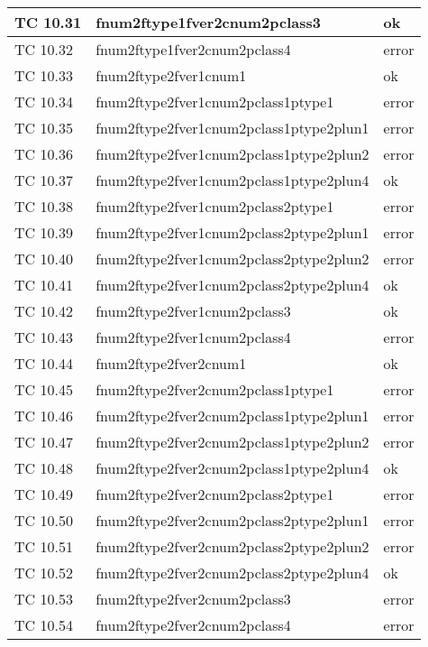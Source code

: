 \begin{longtable}{|p{3cm}|p{7cm}|p{3cm}|}
	\hline
	TC 10.31			& fnum2ftype1fver2cnum2pclass3			& ok \tabularnewline
	\hline
	TC 10.32			& fnum2ftype1fver2cnum2pclass4			& error \tabularnewline
	\hline
	TC 10.33			& fnum2ftype2fver1cnum1				& ok \tabularnewline
	\hline
	TC 10.34			& fnum2ftype2fver1cnum2pclass1ptype1		& error \tabularnewline
	\hline
	TC 10.35			& fnum2ftype2fver1cnum2pclass1ptype2plun1	& error \tabularnewline
	\hline
	TC 10.36			& fnum2ftype2fver1cnum2pclass1ptype2plun2	& error \tabularnewline
	\hline
	TC 10.37			& fnum2ftype2fver1cnum2pclass1ptype2plun4	& ok \tabularnewline
	\hline
	TC 10.38			& fnum2ftype2fver1cnum2pclass2ptype1		& error \tabularnewline
	\hline
	TC 10.39			& fnum2ftype2fver1cnum2pclass2ptype2plun1	& error \tabularnewline
	\hline
	TC 10.40			& fnum2ftype2fver1cnum2pclass2ptype2plun2	& error \tabularnewline
	\hline
	TC 10.41			& fnum2ftype2fver1cnum2pclass2ptype2plun4	& ok \tabularnewline
	\hline
	TC 10.42			& fnum2ftype2fver1cnum2pclass3			& ok \tabularnewline
	\hline
	TC 10.43			& fnum2ftype2fver1cnum2pclass4			& error \tabularnewline
	\hline
	TC 10.44			& fnum2ftype2fver2cnum1				& ok \tabularnewline
	\hline
	TC 10.45			& fnum2ftype2fver2cnum2pclass1ptype1		& error \tabularnewline
	\hline
	TC 10.46			& fnum2ftype2fver2cnum2pclass1ptype2plun1	& error \tabularnewline
	\hline
	TC 10.47			& fnum2ftype2fver2cnum2pclass1ptype2plun2	& error \tabularnewline
	\hline
	TC 10.48			& fnum2ftype2fver2cnum2pclass1ptype2plun4	& ok \tabularnewline
	\hline
	TC 10.49			& fnum2ftype2fver2cnum2pclass2ptype1		& error \tabularnewline
	\hline
	TC 10.50			& fnum2ftype2fver2cnum2pclass2ptype2plun1	& error \tabularnewline
	\hline
	TC 10.51			& fnum2ftype2fver2cnum2pclass2ptype2plun2	& error \tabularnewline
	\hline
	TC 10.52			& fnum2ftype2fver2cnum2pclass2ptype2plun4	& ok \tabularnewline
	\hline
	TC 10.53			& fnum2ftype2fver2cnum2pclass3			& error \tabularnewline
	\hline
	TC 10.54			& fnum2ftype2fver2cnum2pclass4			& error \tabularnewline
	\hline
\end{longtable}
